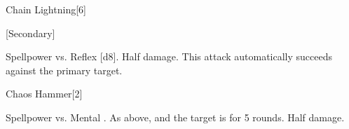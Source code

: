 \begin{spellsection}{Chain Lightning}[6]
    \begin{spellheader}
    \end{spellheader}
    \begin{spellcontent}
        \begin{spelltargetinginfo}
            [Secondary]
        \end{spelltargetinginfo}
        \begin{spelleffects}
            \begin{spellattack}{Spellpower vs. Reflex}
                \spellsuccess {}[d8].
                \spellfailure Half damage.
                \spellspecial This attack automatically succeeds against the primary target.
            \end{spellattack}
        \end{spelleffects}
    \end{spellcontent}
    \begin{spellfooter}
        \miscastexplode
    \end{spellfooter}
\end{spellsection}

\begin{spellsection}{Chaos Hammer}[2]
    \begin{spellheader}
    \end{spellheader}
    \begin{spellcontent}
        \begin{spelltargetinginfo}
        \end{spelltargetinginfo}
        \begin{spelleffects}
            \begin{spellattack}{Spellpower vs. Mental}
                \spellsuccess {}.
                \spellcritical As above, and the target is \disoriented for 5 rounds.
                \spellfailure Half damage.
            \end{spellattack}
        \end{spelleffects}
    \end{spellcontent}
    \begin{spellfooter}
        \miscastrandom
    \end{spellfooter}
\end{spellsection}


